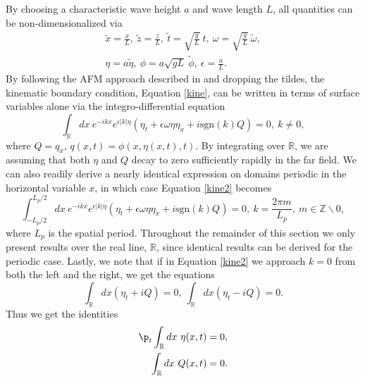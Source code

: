 \documentclass{JFM_Style/jfm}
\begin{document}
By choosing a characteristic wave height $a$ and wave length $L$, all quantities can be non-dimensionalized via
\begin{align*}
\tilde{x} = \frac{x}{L}, ~\tilde{z} = \frac{z}{L}, ~ \tilde{t} = \sqrt{\frac{g}{L}}~t, ~\omega = \sqrt{\frac{g}{L}}~\tilde{\omega}, \\
\eta = a \tilde{\eta}, ~ \phi  = a\sqrt{gL}~\tilde{\phi} , ~ \epsilon = \frac{a}{L}.
\end{align*}
By following the AFM approach described in \cite{afm,ashton} and dropping the tildes, the kinematic boundary condition, Equation \eqref{kine}, can be written in terms of surface variables alone via the integro-differential equation
\begin{equation}
\int_{\mathbb{R}}dx~e^{-ikx}e^{\epsilon|k|\eta}\left(\eta_{t} +
  \epsilon \omega \eta \eta_{x} + i \mbox{sgn}(k)Q \right) = 0, ~
k\neq 0,
\label{kine2}
\end{equation}
where $Q=q_{x}$, $q(x,t) = \phi(x,\eta(x,t),t)$.  By integrating over $\mathbb{R}$, we are assuming that both $\eta$ and $Q$ decay to zero sufficiently rapidly in the far field.  We can also readily derive a nearly identical expression on domains periodic in the horizontal variable $x$, in which case Equation \eqref{kine2} becomes
\begin{equation}
\int_{-L_{p}/2}^{L_{p}/2}dx~e^{-ikx}e^{\epsilon|k|\eta}\left(\eta_{t} +
  \epsilon \omega \eta \eta_{x} + i \mbox{sgn}(k)Q \right) = 0, ~ k = \frac{2\pi m}{L_{p}}, ~ m\in \mathbb{Z}\backslash{0},
\label{integro1per}
\end{equation}
where $L_p$ is the spatial period.  Throughout the remainder of this section we only present results over the real line, $\mathbb{R}$, since identical results can be derived for the periodic case.
Lastly, we note that if in Equation \eqref{kine2} we approach $k=0$ from both the left and the right, we get the equations
\[
\int_{\mathbb{R}}dx \left(\eta_{t} + i Q \right) = 0, ~ \int_{\mathbb{R}}dx \left(\eta_{t} - i Q \right) = 0.
\]
Thus we get the identities
\begin{align}
\p_{t}\int_{\mathbb{R}} dx ~\eta(x,t) & = 0, \label{zavsurf}\\
\int_{\mathbb{R}} dx ~Q(x,t) & = 0. \label{zavpot}
\end{align}
\end{document}
